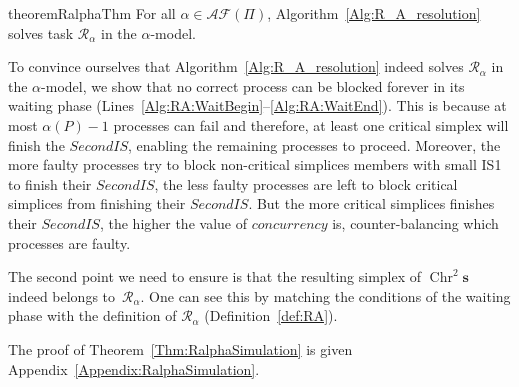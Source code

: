 \documentclass[a4paper]{article}
\def\R{\ensuremath{\mathcal{R}}}
\newcommand{\remove}[1]{}
\def\s {\mathbf{s}}
\def\Chr{\operatorname{Chr}}
\begin{document}
\begin{restatable}{theorem}{RalphaThm}
For all $\alpha\in\mathcal{AF}(\Pi)$, Algorithm~\ref{Alg:R_A_resolution} solves task $\R_\alpha$ in the $\alpha$-model.\label{Thm:RalphaSimulation}
\end{restatable}

To convince ourselves that Algorithm~\ref{Alg:R_A_resolution} indeed solves
$\R_\alpha$ in the $\alpha$-model, we show that no correct
process can be blocked forever in its waiting phase (Lines~\ref{Alg:RA:WaitBegin}--\ref{Alg:RA:WaitEnd}).
This is because at most $\alpha(P)-1$ processes
can fail and therefore, at least one critical simplex will finish the $\mathit{SecondIS}$,
enabling the remaining processes to proceed. 
%
Moreover, the more faulty processes try to block non-critical 
simplices members with small IS1 to finish their $\mathit{SecondIS}$, the 
less faulty processes are left to block critical simplices 
from finishing their $\mathit{SecondIS}$. But the more critical simplices 
finishes their $\mathit{SecondIS}$, the higher the value of $\mathit{concurrency}$ is,
counter-balancing which processes are faulty.

\remove{
we first observe that eventually every correct process
either    
of critical simplices, its members being allowed to continued first before the rest can
follow as most as possible in the same order than in the first immediate snapshot, 
just ensuring that at least one process allowed to continue must be correct (if they
are correct processes left).
}

The second point we need to ensure is that the resulting simplex of
$\Chr^2\s$ indeed belongs to~$\R_{\alpha}$.
%
One can see this by matching the conditions of the waiting phase with the
definition of $\R_{\alpha}$ (Definition~\ref{def:RA}).  
%
\remove{
consists in showing that the second immediate snapshot outputs 
provided to the processes forms in $\Chr^2 \s$ a simplex belonging to $\R_\alpha$.
The fact that it is indeed the case follows mostly from the conditions 
which must be satisfied in order to exit the wait-phase. 
Theses conditions are quite close the restrictions required to form a 
valid $\R_\alpha$ simplex.
}
The proof of Theorem~\ref{Thm:RalphaSimulation} is given Appendix~\ref{Appendix:RalphaSimulation}.

\end{document}
